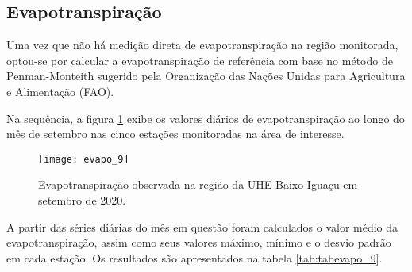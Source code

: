 \documentclass[a4paper,12pt]{article}
\begin{document}
    
    \newpage
     
                   \subsection{Evapotranspiração }
                   
                   \hspace{0.5cm} Uma vez que não há medição direta de evapotranspiração na região monitorada, optou-se por calcular a
                   evapotranspiração de referência com base no método de Penman-Monteith sugerido pela 
                   Organização das Nações Unidas para Agricultura e Alimentação (FAO). 
                   
                   Na sequência, a figura \ref{fig:figevapo_9} exibe os valores diários de evapotranspiração ao longo do mês de setembro nas cinco estações
                   monitoradas na área de interesse.
                       
    

    \begin{figure}[!htb]
    \texttt{[image: evapo\_9]}
    \caption{Evapotranspiração observada na região da UHE Baixo Iguaçu em setembro de 2020.}
    \label{fig:figevapo_9}
    \end{figure}

    A partir das séries diárias do mês em questão foram calculados o valor médio da evapotranspiração, assim como seus valores máximo, mínimo e
    o desvio padrão em cada estação. Os resultados são apresentados na tabela \ref{tab:tabevapo_9}.
    
\end{document}
